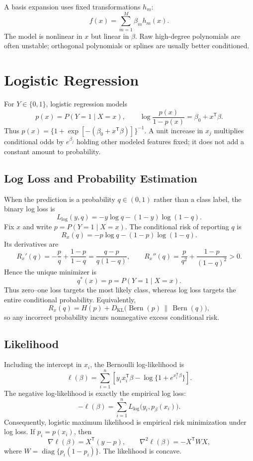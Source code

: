 \documentclass[12pt,oneside]{book}
\numberwithin{equation}{section}
\theoremstyle{definition}
\theoremstyle{plain}
\theoremstyle{remark}
\newcommand{\grad}{\nabla}
\newcommand{\Hess}{\nabla^2}
\newcommand{\diag}{\operatorname{diag}}
\begin{document}
A basis expansion uses fixed transformations $h_m$:
\[
    f(x)=\sum_{m=1}^M\beta_mh_m(x).
\]
The model is nonlinear in $x$ but linear in $\beta$. Raw high-degree
polynomials are often unstable; orthogonal polynomials or splines are usually
better conditioned.

\section{Logistic Regression}

For $Y\in\{0,1\}$, logistic regression models
\begin{equation}
 p(x)=P(Y=1\mid X=x),\qquad
 \log\frac{p(x)}{1-p(x)}=\beta_0+x^\mathsf T\beta.
 \label{eq:logistic-model}
\end{equation}
Thus $p(x)=\{1+\exp[-(\beta_0+x^\mathsf T\beta)]\}^{-1}$. A unit increase in
$x_j$ multiplies conditional odds by $e^{\beta_j}$ holding other modeled
features fixed; it does not add a constant amount to probability.

\subsection{Log Loss and Probability Estimation}
When the prediction is a probability $q\in(0,1)$ rather than a class label,
the binary log loss is
\[
 L_{\log}(y,q)=-y\log q-(1-y)\log(1-q).
\]
Fix $x$ and write $p=P(Y=1\mid X=x)$. The conditional risk of reporting $q$
is
\[
 R_x(q)=-p\log q-(1-p)\log(1-q).
\]
Its derivatives are
\[
 R_x'(q)=-\frac pq+\frac{1-p}{1-q}
 =\frac{q-p}{q(1-q)},
 \qquad
 R_x''(q)=\frac{p}{q^2}+\frac{1-p}{(1-q)^2}>0.
\]
Hence the unique minimizer is
\[
 q^*(x)=p=P(Y=1\mid X=x).
\]
Thus zero--one loss targets the most likely class, whereas log loss targets the
entire conditional probability. Equivalently,
\[
 R_x(q)=H(p)+D_{\mathrm{KL}}
 \bigl(\operatorname{Bern}(p)\,\|\,\operatorname{Bern}(q)\bigr),
\]
so any incorrect probability incurs nonnegative excess conditional risk.

\subsection{Likelihood}

Including the intercept in $x_i$, the Bernoulli log-likelihood is
\begin{equation}
 \ell(\beta)=\sum_{i=1}^n
 [y_ix_i^\mathsf T\beta-\log\{1+e^{x_i^\mathsf T\beta}\}].
 \label{eq:logistic-likelihood}
\end{equation}
The negative log-likelihood is exactly the empirical log loss:
\[
 -\ell(\beta)=\sum_{i=1}^n
 L_{\log}\bigl(y_i,p_\beta(x_i)\bigr).
\]
Consequently, logistic maximum likelihood is empirical risk minimization under
log loss.
If $p_i=p(x_i)$, then
\[
 \grad\ell(\beta)=X^\mathsf T(y-p),\qquad
 \Hess\ell(\beta)=-X^\mathsf TWX,
\]
where $W=\diag\{p_i(1-p_i)\}$. The likelihood is concave.
\end{document}
